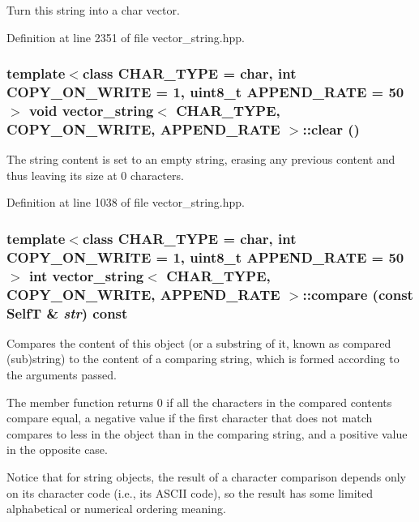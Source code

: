 Turn this string into a char vector. 

Definition at line 2351 of file vector\_\-string.hpp.\hypertarget{classvector__string_f5c9e2462a6d6d5eac6cbf0246ba957f}{
\subsubsection[{clear}]{\setlength{\rightskip}{0pt plus 5cm}template$<$class CHAR\_\-TYPE  = char, int COPY\_\-ON\_\-WRITE = 1, uint8\_\-t APPEND\_\-RATE = 50$>$ void {\bf vector\_\-string}$<$ CHAR\_\-TYPE, COPY\_\-ON\_\-WRITE, APPEND\_\-RATE $>$::clear ()}}
\label{classvector__string_f5c9e2462a6d6d5eac6cbf0246ba957f}


The string content is set to an empty string, erasing any previous content and thus leaving its size at 0 characters. 

Definition at line 1038 of file vector\_\-string.hpp.\hypertarget{classvector__string_1604ed59691edc6579fadedf04fa4cbb}{
\subsubsection[{compare}]{\setlength{\rightskip}{0pt plus 5cm}template$<$class CHAR\_\-TYPE  = char, int COPY\_\-ON\_\-WRITE = 1, uint8\_\-t APPEND\_\-RATE = 50$>$ int {\bf vector\_\-string}$<$ CHAR\_\-TYPE, COPY\_\-ON\_\-WRITE, APPEND\_\-RATE $>$::compare (const {\bf SelfT} \& {\em str}) const}}
\label{classvector__string_1604ed59691edc6579fadedf04fa4cbb}


Compares the content of this object (or a substring of it, known as compared (sub)string) to the content of a comparing string, which is formed according to the arguments passed.

The member function returns 0 if all the characters in the compared contents compare equal, a negative value if the first character that does not match compares to less in the object than in the comparing string, and a positive value in the opposite case.

Notice that for string objects, the result of a character comparison depends only on its character code (i.e., its ASCII code), so the result has some limited alphabetical or numerical ordering meaning.

